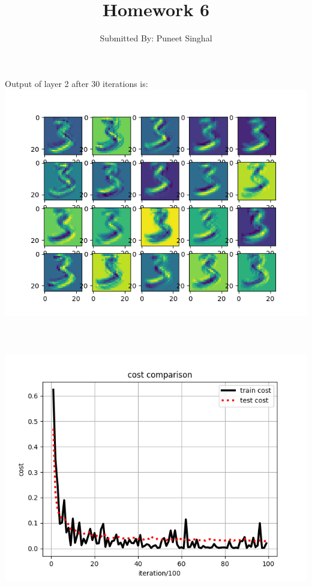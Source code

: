 \documentclass[fleqn]{article}
\title{Homework 6}
\author{Submitted By: Puneet Singhal\\}
\date{}
\begin{document}
\maketitle
{}

\setcounter{section}{3}
\section{}
\begin{adjustwidth}{4em}{0pt}
	Output of layer 2 after 30 iterations is: \\
	\includegraphics[scale = 1]{output2_30_iterations.png}\\ \\	
\end{adjustwidth}

\section{}
\begin{adjustwidth}{4em}{0pt}
	\includegraphics[scale = 1]{cost_comparison.png}\\ \\	
\end{adjustwidth}
\end{document}
